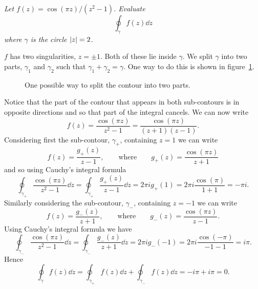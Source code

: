 \documentclass{article}
\begin{document}
    \begin{example}
        \textit{Let \(f(z) = \cos(\pi z) / (z^2 - 1)\). Evaluate}
        \[\oint_{\gamma}f(z)\dd{z}\]
        \textit{where \(\gamma\) is the circle \(\abs{z} = 2\).}
        
        \(f\) has two singularities, \(z = \pm 1\).
        Both of these lie inside \(\gamma\).
        We split \(\gamma\) into two parts, \(\gamma_1\) and \(\gamma_2\) such that \(\gamma_1 + \gamma_2 = \gamma\).
        One way to do this is shown in figure~\ref{fig:cif example contour}.
        \begin{figure}[ht]
            \centering
            \tikzexternalenable
            \tikzexternaldisable
            \caption{One possible way to split the contour into two parts.}
            \label{fig:cif example contour}
        \end{figure}
        Notice that the part of the contour that appears in both sub-contours is in opposite directions and so that part of the integral cancels.
        We can now write
        \[f(z) = \frac{\cos(\pi z)}{z^2 - 1} = \frac{\cos(\pi z)}{(z + 1)(z - 1)}.\]
        Considering first the sub-contour, \(\gamma_+\), containing \(z = 1\) we can write
        \[f(z) = \frac{g_+(z)}{z - 1}, \qquad\text{where}\qquad g_+(z) = \frac{\cos(\pi z)}{z + 1}\]
        and so using Cauchy's integral formula
        \[\oint_{\gamma_+} \frac{\cos(\pi z)}{z^2 - 1} \dd{z} = \oint_{\gamma_+} \frac{g_+(z)}{z - 1} \dd{z} = 2\pi ig_+(1) = 2\pi i\frac{\cos(\pi)}{1 + 1} = -\pi i.\]
        Similarly considering the sub-contour, \(\gamma_-\), containing \(z = -1\) we can write
        \[f(z) = \frac{g_-(z)}{z + 1}, \qquad\text{where}\qquad g_-(z) = \frac{\cos(\pi z)}{z - 1}.\]
        Using Cauchy's integral formula we have
        \[\oint_{\gamma_-} \frac{\cos(\pi z)}{z^2 - 1}\dd{z} = \oint_{\gamma_-} \frac{g_-(z)}{z + 1}\dd{z} = 2\pi ig_-(-1) = 2\pi i\frac{\cos(-\pi)}{-1 - 1} = i\pi.\]
        Hence
        \[\oint_{\gamma}f(z) \dd{z} = \oint_{\gamma_+}f(z)\dd{z} + \oint_{\gamma_-} f(z)\dd{z} = -i\pi + i\pi = 0.\]
    \end{example}
    
\end{document}
